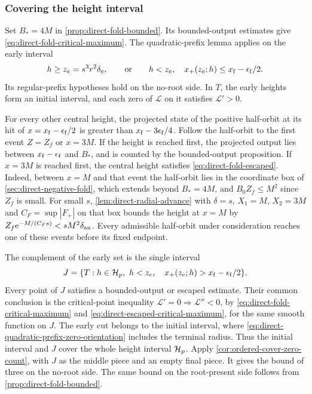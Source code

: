 \subsubsection{Covering the height interval}

Set \(B_*=4M\) in \cref{prop:direct-fold-bounded}.
Its bounded-output estimates give
\eqref{eq:direct-fold-critical-maximum}.
The quadratic-prefix lemma applies on the early interval
\[
 h\ge z_e=s^3r^2\delta_e,\qquad\hbox{or}\qquad
 h<z_e,\quad x_+(z_e;h)\le x_{\rm f}-\epsilon_{\rm f}/2 .
\]
Its regular-prefix hypotheses hold on the no-root side. In \(T\),
the early heights form an initial interval, and each zero of \(\mathcal L\) on it
satisfies \(\mathcal L'>0\).

For every other central height, the projected state of the positive
half-orbit at its hit of \(x=x_{\rm f}-\epsilon_{\rm f}/2\) is greater than
\(x_{\rm f}-3\epsilon_{\rm f}/4\).
Follow the half-orbit to the first event \(Z=Z_f\) or \(x=3M\).
If the height is reached first, the projected output
lies between \(x_{\rm f}-\epsilon_{\rm f}\) and \(B_*\), and is counted by
the bounded-output proposition.
If \(x=3M\) is reached first, the central height satisfies
\eqref{eq:direct-fold-escaped}. Indeed, between \(x=M\) and that event
the half-orbit lies in the coordinate box of
\cref{sec:direct-negative-fold}, which extends beyond \(B_*=4M\), and
\(B_0Z_f\le M^2\) since \(Z_f\) is small. For small \(s\),
\cref{lem:direct-radial-advance} with \(\delta=s\), \(X_1=M\), \(X_2=3M\)
and \(C_F=\sup|F_+|\) on that box bounds the height at \(x=M\) by
\(Z_f\mathrm e^{-M/(C_Fs)}<sM^2\delta_{\rm an}\).
Every admissible half-orbit under consideration reaches one of these
events before its fixed endpoint.

The complement of the early set is the single interval
\[
 J=\{T:h\in\mathcal H_p,\ h<z_e,\quad
                      x_+(z_e;h)>x_{\rm f}-\epsilon_{\rm f}/2\}.
\]
Every point of \(J\) satisfies a bounded-output or escaped estimate.
Their common conclusion is the critical-point inequality
\(\mathcal L'=0\Rightarrow\mathcal L''<0\), by
\eqref{eq:direct-fold-critical-maximum} and
\eqref{eq:direct-escaped-critical-maximum}, for the same smooth function
on \(J\). The early cut
belongs to the initial interval, where
\eqref{eq:direct-quadratic-prefix-zero-orientation} includes the
terminal radius. Thus the initial interval and \(J\) cover the
whole height interval \(\mathcal H_p\).
Apply \cref{cor:ordered-cover-zero-count}, with \(J\) as the
middle piece and an empty final piece. It gives the bound of three on
the no-root side. The same bound on the
root-present side follows from \cref{prop:direct-fold-bounded}.
